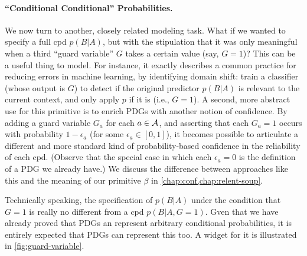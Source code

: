 \paragraph{``Conditional Conditional'' Probabilities.}
We now turn to another, closely related modeling task. 
What if we wanted to specify a full cpd $p(B|A)$, but with the stipulation that it was only meaningful when a third ``guard variable'' $G$ takes a certain value (say, $G{=}1$)?
This can be a useful thing to model. For instance, it exactly describes
    a common practice for reducing errors in machine learning, by identifying domain shift: train a classifier (whose output is $G$) to detect if the original predictor $p(B|A)$ is relevant to the current context, and only apply $p$ if it is (i.e., $G{=}1$).
A second, more abstract use for this primitive is to enrich PDGs with another notion of confidence. 
By adding a guard variable $G_a$ for each $a \in \mathcal A$, and asserting that each $G_a = 1$ occurs with probability $1 - \epsilon_a$ (for some $\epsilon_a \in [0,1]$), it becomes possible to articulate a different and more standard kind of probability-based confidence in the reliability of each cpd.
(Observe that the special case in which each $\epsilon_a= 0$ is the definition of a PDG we already have.)
We discuss the difference between approaches like this and the meaning of our primitive $\beta$ in \cref{chap:conf,chap:relent-soup}. 

Technically speaking, the specification of $p(B|A)$ under the condition that $G = 1$ is really no different from a cpd $p(B|A, G{=}1)$.
Gven that we have already proved that PDGs an represent arbitrary conditional probabilities, it is entirely expected that PDGs can represent this too. 
A widget for it is illustrated in \cref{fig:guard-variable}.

